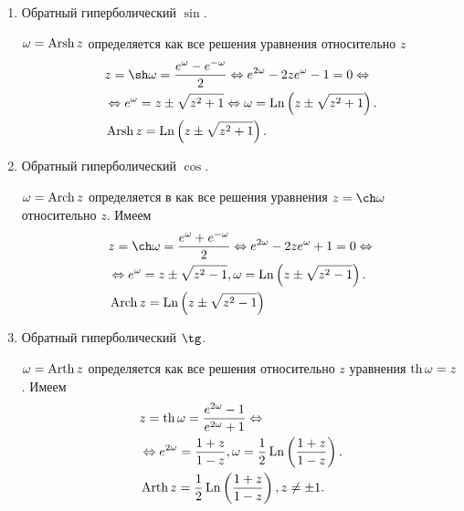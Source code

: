 
\begin{col-answer-preambule}
\end{col-answer-preambule}
\begin{enumerate}
\item Обратный гиперболический $\sin$.

  $\omega = \operatorname{Arsh} z$ определяется как все решения уравнения относительно $z$
  \begin{align*}
    &z = \sh \omega = \dfrac{e^{\omega} - e^{-\omega}}{2} \Leftrightarrow
    e^{2\omega} - 2ze^{\omega} - 1 = 0 \Leftrightarrow\\
    &\Leftrightarrow
    e^{\omega} = z \pm \sqrt{z^2 + 1} \Leftrightarrow \omega = \Ln\parenthesis{z \pm \sqrt{z^2 +
        1}}.\\
    &\Arsh z = \Ln\parenthesis{z \pm \sqrt{z^2 + 1}}.
  \end{align*}

\item Обратный гиперболический $\cos$.

  $\omega = \operatorname{Arch} z$ определяется в как все решения уравнения $z = \ch \omega$ относительно $z$.
  Имеем
  \begin{align*}
    &z = \ch \omega = \dfrac{e^{\omega} + e^{-\omega}}{2} \Leftrightarrow e^{2\omega} - 2ze^{\omega} + 1 = 0
    \Leftrightarrow\\
    &\Leftrightarrow e^{\omega} = z\pm\sqrt{z^2 - 1}, \omega = \Ln\parenthesis{z \pm \sqrt{z^2 - 1}}.\\
    &\Arch z = \Ln\parenthesis{z \pm \sqrt{z^2 - 1}}
  \end{align*}

\item Обратный гиперболический $\tg$.

  $\omega = \operatorname{Arth} z$ определяется как все решения относительно $z$ уравнения $\operatorname{th} \omega = z$. Имеем
  \begin{align*}
    &z = \operatorname{th} \omega = \dfrac{e^{2\omega} - 1}{e^{2\omega} + 1} \Leftrightarrow\\
    &\Leftrightarrow e^{2\omega} = \dfrac{1 + z}{1 - z}, \omega = \dfrac{1}{2}\operatorname{Ln}
    \left( \dfrac{1 + z}{1 - z} \right).\\
    &\operatorname{Arth} z = \dfrac{1}{2}\operatorname{Ln}\left( \dfrac{1 + z}{1 - z} \right), z \neq \pm 1.
  \end{align*}


\end{enumerate}
